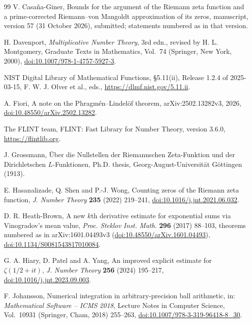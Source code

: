 \documentclass[11pt,reqno]{amsart}
\numberwithin{equation}{section}
\theoremstyle{definition}
\theoremstyle{remark}
\begin{document}
\begin{thebibliography}{99}
 V. Casa\~na-Giner, Bounds for the argument of the Riemann zeta function and a prime-corrected Riemann--von Mangoldt approximation of its zeros, manuscript, version 57 (31 October 2026), submitted; statements numbered as in that version.

 H. Davenport, \textit{Multiplicative Number Theory}, 3rd edn., revised by H. L. Montgomery, Graduate Texts in Mathematics, Vol.~74 (Springer, New York, 2000), \href{https://doi.org/10.1007/978-1-4757-5927-3}{doi:10.1007/978-1-4757-5927-3}.

 NIST Digital Library of Mathematical Functions, \S5.11(ii), Release 1.2.4 of 2025-03-15, F. W. J. Olver et al., eds., \url{https://dlmf.nist.gov/5.11.ii}.

 A. Fiori, A note on the Phragm\'en--Lindel\"of theorem, arXiv:2502.13282v3, 2026, \href{https://doi.org/10.48550/arXiv.2502.13282}{doi:10.48550/arXiv.2502.13282}.

 The FLINT team, FLINT: Fast Library for Number Theory, version 3.6.0, \url{https://flintlib.org}.

 J. Grossmann, \"Uber die Nullstellen der Riemannschen Zeta-Funktion und der Dirichletschen $L$-Funktionen, Ph.D. thesis, Georg-August-Universit\"at G\"ottingen (1913).

 E. Hasanalizade, Q. Shen and P.-J. Wong, Counting zeros of the Riemann zeta function, \textit{J. Number Theory} \textbf{235} (2022) 219--241, \href{https://doi.org/10.1016/j.jnt.2021.06.032}{doi:10.1016/j.jnt.2021.06.032}.

 D. R. Heath-Brown, A new $k$th derivative estimate for exponential sums via Vinogradov's mean value, \textit{Proc. Steklov Inst. Math.} \textbf{296} (2017) 88--103, theorems numbered as in arXiv:1601.04493v3 (\href{https://doi.org/10.48550/arXiv.1601.04493}{doi:10.48550/arXiv.1601.04493}), \href{https://doi.org/10.1134/S0081543817010084}{doi:10.1134/S0081543817010084}.

 G. A. Hiary, D. Patel and A. Yang, An improved explicit estimate for $\zeta(1/2+it)$, \textit{J. Number Theory} \textbf{256} (2024) 195--217, \href{https://doi.org/10.1016/j.jnt.2023.09.003}{doi:10.1016/j.jnt.2023.09.003}.

 F. Johansson, Numerical integration in arbitrary-precision ball arithmetic, in: \textit{Mathematical Software -- ICMS 2018}, Lecture Notes in Computer Science, Vol.~10931 (Springer, Cham, 2018) 255--263, \href{https://doi.org/10.1007/978-3-319-96418-8_30}{doi:10.1007/978-3-319-96418-8\_30}.


\end{thebibliography}
\end{document}
